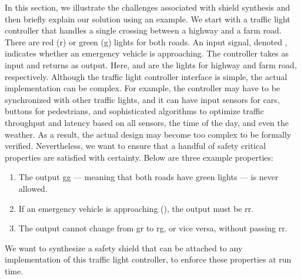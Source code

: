\documentclass{llncs}
\begin{document}
In this section, we illustrate the challenges associated with shield 
synthesis and then briefly explain our solution using an example.  
We start with a traffic light controller that handles a single crossing 
between a highway and a farm road.  There are red (\textsf{r}) or green 
(\textsf{g}) lights for both roads.  An input signal, denoted 
, indicates whether an emergency vehicle is 
approaching.  The controller takes  as input and returns 
 as output.  Here,  and 
 are the lights for highway and farm road, 
respectively.
Although the traffic light controller interface is simple, the actual 
implementation can be complex.  For example, the controller may have to 
be synchronized with other traffic lights, and it can have input sensors 
for cars, buttons for pedestrians, and sophisticated algorithms to 
optimize traffic throughput and latency based on all sensors, the time 
of the day, and even the weather.  As a result, the actual design may 
become too complex to be formally verified.  Nevertheless, we want to 
ensure that a handful of safety critical properties are satisfied with 
certainty.  Below are three example properties:
\begin{enumerate}
\item The output \textsf{gg} --- meaning that both roads have green
  lights --- is never allowed.
\item If an emergency vehicle is approaching (), the
  output must be \textsf{rr}.
\item The output cannot change from \textsf{gr} to \textsf{rg}, or
  vice versa, without passing \textsf{rr}.
\end{enumerate}
We want to synthesize a safety shield that can be attached to any 
implementation of this traffic light controller, to enforce these 
properties at run time.
\end{document}
